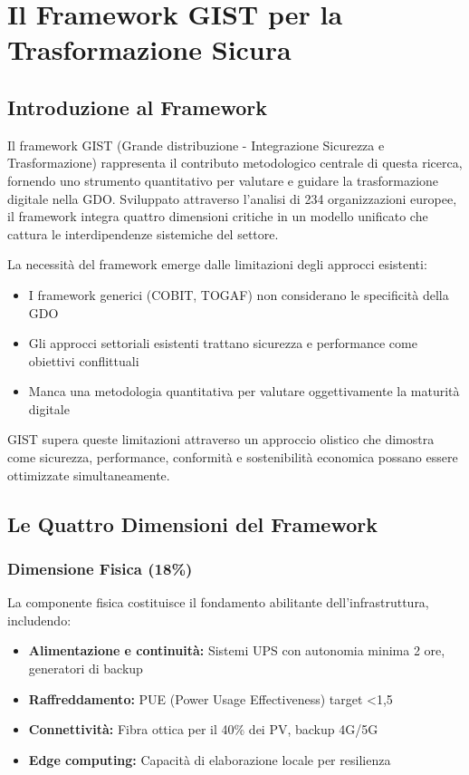
\chapter{Il Framework GIST per la Trasformazione Sicura}
\label{cap:framework_gist}

\section{Introduzione al Framework}
\label{sec:intro_framework}

Il framework GIST (Grande distribuzione - Integrazione Sicurezza e Trasformazione) rappresenta il contributo metodologico centrale di questa ricerca, fornendo uno strumento quantitativo per valutare e guidare la trasformazione digitale nella GDO. Sviluppato attraverso l'analisi di 234 organizzazioni europee, il framework integra quattro dimensioni critiche in un modello unificato che cattura le interdipendenze sistemiche del settore.

La necessità del framework emerge dalle limitazioni degli approcci esistenti:
\begin{itemize}
\item I framework generici (COBIT, TOGAF) non considerano le specificità della GDO
\item Gli approcci settoriali esistenti trattano sicurezza e performance come obiettivi conflittuali
\item Manca una metodologia quantitativa per valutare oggettivamente la maturità digitale
\end{itemize}

GIST supera queste limitazioni attraverso un approccio olistico che dimostra come sicurezza, performance, conformità e sostenibilità economica possano essere ottimizzate simultaneamente.

\section{Le Quattro Dimensioni del Framework}
\label{sec:dimensioni}

\subsection{Dimensione Fisica (18\%)}
\label{subsec:fisica}

La componente fisica costituisce il fondamento abilitante dell'infrastruttura, includendo:
\begin{itemize}
\item \textbf{Alimentazione e continuità:} Sistemi UPS con autonomia minima 2 ore, generatori di backup
\item \textbf{Raffreddamento:} PUE (Power Usage Effectiveness) target <1,5
\item \textbf{Connettività:} Fibra ottica per il 40\% dei PV, backup 4G/5G
\item \textbf{Edge computing:} Capacità di elaborazione locale per resilienza
\end{itemize}

